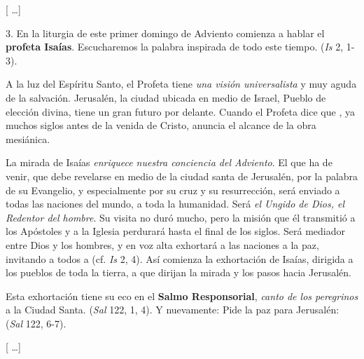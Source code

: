 \begin{body}
\begin{body}
		{[} \ldots{}{]}

		3. En la liturgia de este primer domingo de Adviento comienza a hablar el \textbf{profeta Isaías}. Escucharemos la palabra inspirada de todo este tiempo.  (\emph{Is} 2, 1-3).

		A la luz del Espíritu Santo, el Profeta tiene \emph{una visión universalista} y muy aguda de la salvación. Jerusalén, la ciudad ubicada en medio de Israel, Pueblo de elección divina, tiene un gran futuro por delante. Cuando el Profeta dice que , ya muchos siglos antes de la venida de Cristo, anuncia el alcance de la obra mesiánica.

		La mirada de Isaías \emph{enriquece nuestra conciencia del Adviento}. El que ha de venir, que debe revelarse  en medio de la ciudad santa de Jerusalén, por la palabra de su Evangelio, y especialmente por su cruz y su resurrección, será enviado a todas las naciones del mundo, a toda la humanidad. Será \emph{el Ungido de Dios, el Redentor del hombre}. Su visita no duró mucho, pero la misión que él transmitió a los Apóstoles y a la Iglesia perdurará hasta el final de los siglos. Será mediador entre Dios y los hombres, y en voz alta exhortará a las naciones a la paz, invitando a todos a  (cf. \emph{Is} 2, 4). Así comienza la exhortación de Isaías, dirigida a los pueblos de toda la tierra, a que dirijan la mirada y los pasos hacia Jerusalén.

		Esta exhortación tiene su eco en el \textbf{Salmo Responsorial}, \emph{canto de los peregrinos} a la Ciudad Santa.  (\emph{Sal} 122, 1, 4). Y nuevamente: Pide la paz para Jerusalén:  (\emph{Sal} 122, 6-7).

		{[} \ldots{}{]}


\end{body}
\end{body}
